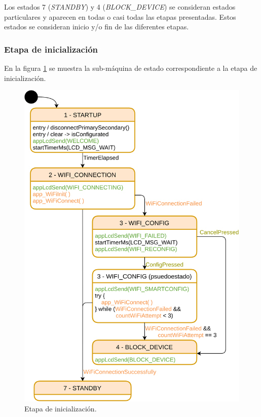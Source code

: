 Los estados 7 (\textit{STANDBY}) y 4 (\textit{BLOCK\_DEVICE}) se consideran estados particulares y aparecen en todas o casi todas las etapas presentadas. Estos estados se consideran inicio y/o fin de las diferentes etapas.

\subsubsection{Etapa de inicialización}
\label{subsubsec:EtIni}
En la figura \ref{fig:MainFSM_1} se muestra la sub-máquina de estado correspondiente a la etapa de inicialización. 

\begin{figure}[htpb]
	\centering
	\includegraphics[scale=1]{./Figures/MainFSM_1.png}
	\caption{Etapa de inicialización.}
	\label{fig:MainFSM_1}
\end{figure}

